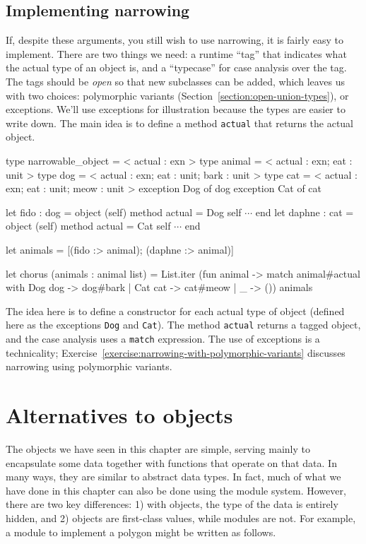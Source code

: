 \subsection{Implementing narrowing}

If, despite these arguments, you still wish to use narrowing, it is fairly easy to implement.
There are two things we need: a runtime ``tag'' that indicates what the actual type of an object is,
and a ``typecase'' for case analysis over the tag.  The tags should be \emph{open} so that new
subclasses can be added, which leaves us with two choices: polymorphic variants
(Section~\ref{section:open-union-types}), or exceptions.  We'll use exceptions for illustration
because the types are easier to write down.  The main idea is to define a method \hbox{\lstinline/actual/}
that returns the actual object.

\label{page:narrowing-with-exceptions}
\begin{ocaml}
type narrowable_object = < actual : exn >
type animal = < actual : exn; eat : unit >
type dog = < actual : exn; eat : unit; bark : unit >
type cat = < actual : exn; eat : unit; meow : unit >
exception Dog of dog
exception Cat of cat

let fido : dog = object (self) method actual = Dog self $\cdots$ end
let daphne : cat = object (self) method actual = Cat self $\cdots$ end

let animals = [(fido :> animal); (daphne :> animal)]

let chorus (animals : animal list) =
   List.iter (fun animal ->
      match animal#actual with
         Dog dog -> dog#bark
       | Cat cat -> cat#meow
       | _ -> ()) animals
\end{ocaml}
%
The idea here is to define a constructor for each actual type of object (defined here as the
exceptions \hbox{\lstinline/Dog/} and \hbox{\lstinline/Cat/}).  The method \hbox{\lstinline/actual/} returns a tagged
object, and the case analysis uses a \hbox{\lstinline/match/} expression.  The use of exceptions is a
technicality; Exercise~\ref{exercise:narrowing-with-polymorphic-variants} discusses narrowing using
polymorphic variants.

\section{Alternatives to objects}

The objects we have seen in this chapter are simple, serving mainly to encapsulate some data
together with functions that operate on that data.  In many ways, they are similar to abstract data
types.  In fact, much of what we have done in this chapter can also be done using the module
system.  However, there are two key differences: 1) with objects, the type of the data is entirely hidden,
and 2) objects are first-class values, while modules are not.  For example, a module to implement
a polygon might be written as follows.

